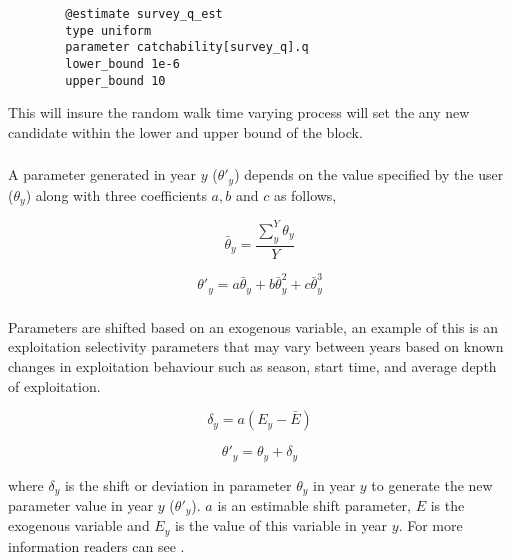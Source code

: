 {\small{\begin{verbatim}
		@estimate survey_q_est
		type uniform
		parameter catchability[survey_q].q
		lower_bound 1e-6
		upper_bound 10
		\end{verbatim}}}
This will insure the random walk time varying process will set the any new candidate within the lower and upper bound of the  block.

\subsubsection[Annual shift]{}

A parameter generated in year $y$ ($\theta'_y$) depends on the value specified by the user ($\theta_y$) along with three coefficients $a,b$ and $c$ as follows,

\begin{equation}
\bar{\theta}_y = \frac{\sum_{y}^Y\theta_y}{Y}
\end{equation}

\begin{equation}
\theta'_y = a \bar{\theta}_y + b\bar{\theta}_y^{2} + c\bar{\theta}_y^{3}
\end{equation}

\subsubsection[Exogenous]{}

Parameters are shifted based on an exogenous variable, an example of this is an exploitation selectivity parameters that may vary between years based on known changes in exploitation behaviour such as season, start time, and average depth of exploitation.

\begin{equation}
\delta_y = a(E_y - \bar{E})
\end{equation}

\begin{equation}
\theta'_y = \theta_y + \delta_y
\end{equation}

where $\delta_y$ is the shift or deviation in parameter $\theta_y$ in year $y$ to generate the new parameter value in year $y$ ($\theta'_y$). $a$ is an estimable shift parameter, $E$ is the exogenous variable and $E_y$ is the value of this variable in year $y$. For more information readers can see \cite{francis_03}.

